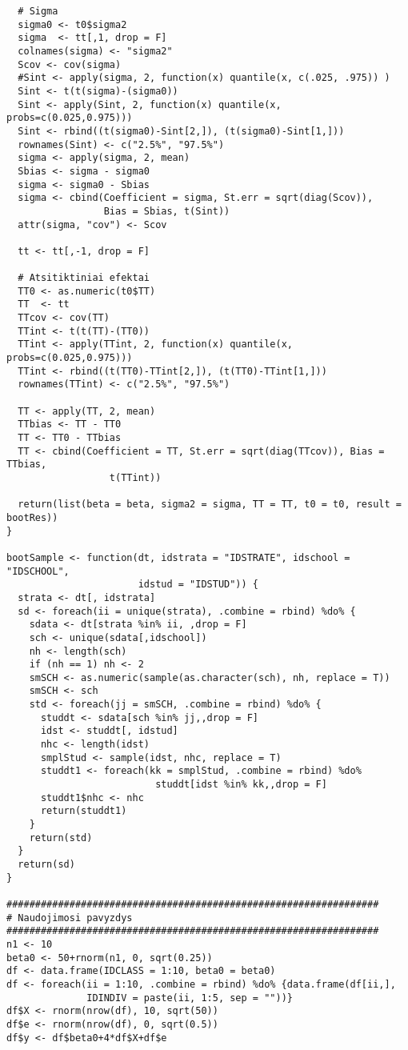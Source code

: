 \documentclass[12pt,a4paper]{article}
\begin{document}
\begin{appendix}
\begin{footnotesize}
\begin{verbatim}
  # Sigma
  sigma0 <- t0$sigma2
  sigma  <- tt[,1, drop = F]
  colnames(sigma) <- "sigma2"
  Scov <- cov(sigma)
  #Sint <- apply(sigma, 2, function(x) quantile(x, c(.025, .975)) )
  Sint <- t(t(sigma)-(sigma0))
  Sint <- apply(Sint, 2, function(x) quantile(x, probs=c(0.025,0.975)))
  Sint <- rbind((t(sigma0)-Sint[2,]), (t(sigma0)-Sint[1,]))
  rownames(Sint) <- c("2.5%", "97.5%")
  sigma <- apply(sigma, 2, mean)
  Sbias <- sigma - sigma0
  sigma <- sigma0 - Sbias
  sigma <- cbind(Coefficient = sigma, St.err = sqrt(diag(Scov)), 
                 Bias = Sbias, t(Sint))
  attr(sigma, "cov") <- Scov
  
  tt <- tt[,-1, drop = F]
  
  # Atsitiktiniai efektai
  TT0 <- as.numeric(t0$TT)
  TT  <- tt
  TTcov <- cov(TT)
  TTint <- t(t(TT)-(TT0))
  TTint <- apply(TTint, 2, function(x) quantile(x, probs=c(0.025,0.975)))
  TTint <- rbind((t(TT0)-TTint[2,]), (t(TT0)-TTint[1,]))
  rownames(TTint) <- c("2.5%", "97.5%")
  
  TT <- apply(TT, 2, mean)
  TTbias <- TT - TT0
  TT <- TT0 - TTbias
  TT <- cbind(Coefficient = TT, St.err = sqrt(diag(TTcov)), Bias = TTbias,
                  t(TTint))
  
  return(list(beta = beta, sigma2 = sigma, TT = TT, t0 = t0, result = bootRes))
}

bootSample <- function(dt, idstrata = "IDSTRATE", idschool = "IDSCHOOL",
                       idstud = "IDSTUD")) {
  strata <- dt[, idstrata]
  sd <- foreach(ii = unique(strata), .combine = rbind) %do% {
    sdata <- dt[strata %in% ii, ,drop = F]
    sch <- unique(sdata[,idschool])
    nh <- length(sch)
    if (nh == 1) nh <- 2
    smSCH <- as.numeric(sample(as.character(sch), nh, replace = T))
    smSCH <- sch
    std <- foreach(jj = smSCH, .combine = rbind) %do% {
      studdt <- sdata[sch %in% jj,,drop = F]
      idst <- studdt[, idstud]
      nhc <- length(idst)
      smplStud <- sample(idst, nhc, replace = T)
      studdt1 <- foreach(kk = smplStud, .combine = rbind) %do% 
                          studdt[idst %in% kk,,drop = F]
      studdt1$nhc <- nhc
      return(studdt1)
    }
    return(std)
  }
  return(sd)
}

#################################################################
# Naudojimosi pavyzdys
#################################################################
n1 <- 10
beta0 <- 50+rnorm(n1, 0, sqrt(0.25))
df <- data.frame(IDCLASS = 1:10, beta0 = beta0)
df <- foreach(ii = 1:10, .combine = rbind) %do% {data.frame(df[ii,],
              IDINDIV = paste(ii, 1:5, sep = ""))}
df$X <- rnorm(nrow(df), 10, sqrt(50))
df$e <- rnorm(nrow(df), 0, sqrt(0.5))
df$y <- df$beta0+4*df$X+df$e


\end{verbatim}
\end{footnotesize}
\end{appendix}
\end{document}
